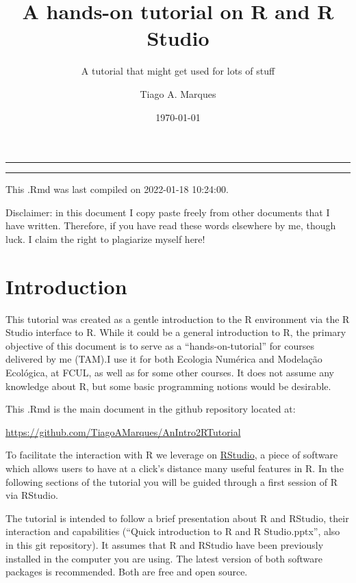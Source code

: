 \documentclass[
]{article}
\title{A hands-on tutorial on R and R Studio}
\subtitle{A tutorial that might get used for lots of stuff}
\author{Tiago A. Marques}
\date{\today}
\begin{document}
\maketitle

{
\hypersetup{linkcolor=}
\setcounter{tocdepth}{3}
\tableofcontents
}
\begin{center}\rule{0.5\linewidth}{0.5pt}\end{center}

\begin{center}\rule{0.5\linewidth}{0.5pt}\end{center}

\newpage

This .Rmd was last compiled on 2022-01-18 10:24:00.

Disclaimer: in this document I copy paste freely from other documents
that I have written. Therefore, if you have read these words elsewhere
by me, though luck. I claim the right to plagiarize myself here!

\hypertarget{introduction}{%
\section{Introduction}\label{introduction}}

This tutorial was created as a gentle introduction to the R environment
via the R Studio interface to R. While it could be a general
introduction to R, the primary objective of this document is to serve as
a ``hands-on-tutorial'' for courses delivered by me (TAM).I use it for
both Ecologia Numérica and Modelação Ecológica, at FCUL, as well as for
some other courses. It does not assume any knowledge about R, but some
basic programming notions would be desirable.

This .Rmd is the main document in the github repository located at:

\url{https://github.com/TiagoAMarques/AnIntro2RTutorial}

To facilitate the interaction with R we leverage on
\href{https://www.rstudio.com/}{RStudio}, a piece of software which
allows users to have at a click's distance many useful features in R. In
the following sections of the tutorial you will be guided through a
first session of R via RStudio.

The tutorial is intended to follow a brief presentation about R and
RStudio, their interaction and capabilities (``Quick introduction to R
and R Studio.pptx'', also in this git repository). It assumes that R and
RStudio have been previously installed in the computer you are using.
The latest version of both software packages is recommended. Both are
free and open source.
\end{document}
